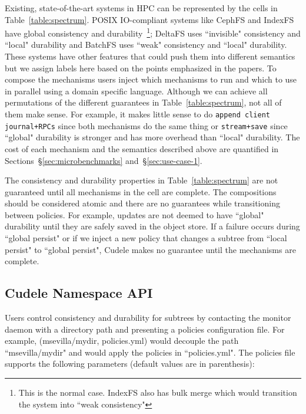 Existing, state-of-the-art systems in HPC can be represented by the cells in
Table~\ref{table:spectrum}.  POSIX IO-compliant systems like CephFS and IndexFS
have global consistency and durability~\footnote{This is the normal case.
IndexFS also has bulk merge which would transition the system into ``weak
consistency"}; DeltaFS uses ``invisible" consistency and ``local" durability
and BatchFS uses ``weak" consistency and ``local" durability. These systems
have other features that could push them into different semantics but we assign
labels here based on the points emphasized in the papers.  To compose the
mechanisms users inject which mechanisms to run and which to use in parallel
using a domain specific language.  Although we can achieve all permutations of
the different guarantees in Table~\ref{table:spectrum}, not all of them make
sense. For example, it makes little sense to do \texttt{append client
journal+RPCs} since both mechanisms do the same thing or \texttt{stream+save}
since ``global" durability is stronger and has more overhead than ``local"
durability. The cost of each mechanism and the semantics described above are
quantified in Sections~\S\ref{sec:microbenchmarks} and~\S\ref{sec:use-case-1}.

The consistency and durability properties in Table~\ref{table:spectrum} are not
guaranteed until all mechanisms in the cell are complete. The compositions
should be considered atomic and there are no guarantees while transitioning
between policies. For example, updates are not deemed to have ``global" durability until
they are safely saved in the object store. If a failure occurs during ``global
persist" or if we inject a new policy that changes a subtree from ``local
persist" to ``global persist", Cudele makes no guarantee until the mechanisms are
complete.

\subsection{Cudele Namespace API}
\label{sec:cudelefs-namespace-api}



Users control consistency and durability for subtrees by contacting the monitor
daemon with a directory path and presenting a policies configuration file.
For example, (msevilla/mydir, policies.yml) would decouple the path
``msevilla/mydir" and would apply the policies in ``policies.yml".  The
policies file supports the following parameters (default values are in parenthesis):

